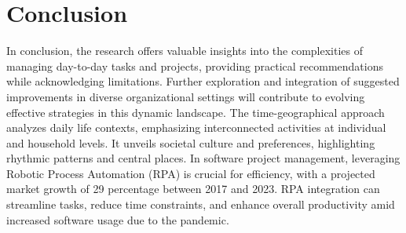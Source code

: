 \documentclass{chart}
\begin{document}
 \section{Conclusion}
\hspace{1cm}In conclusion, the research offers valuable insights into the complexities of managing day-to-day tasks and projects, providing practical recommendations while acknowledging limitations. Further exploration and integration of suggested improvements in diverse organizational settings will contribute to evolving effective strategies in this dynamic landscape. The time-geographical approach analyzes daily life contexts, emphasizing interconnected activities at individual and household levels. It unveils societal culture and preferences, highlighting rhythmic patterns and central places. In software project management, leveraging Robotic Process Automation (RPA) is crucial for efficiency, with a projected market growth of 29 percentage  between 2017 and 2023. RPA integration can streamline tasks, reduce time constraints, and enhance overall productivity amid increased software usage due to the pandemic.


 



 
\end{document}

